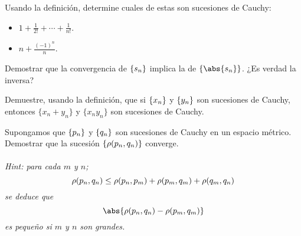 \begin{ejercicio}
	Usando la definición, determine cuales de estas son sucesiones de Cauchy:
	\begin{itemize}
		\item $1 + \frac{1}{2!} + \cdots + \frac{1}{n!}$.
		\item $n + \frac{(-1)^n}{n}$.
	\end{itemize}
\end{ejercicio}






\begin{ejercicio}
	Demostrar que la convergencia de $\{ s_{n} \}$ implica la de $\{ \abs{s_n} \}$. ¿Es verdad la inversa?
\end{ejercicio}




\begin{ejercicio}
	Demuestre, usando la definición, que si $\{ x_{n} \}$ y $\{ y_{n} \}$ son sucesiones de Cauchy, entonces $\{ x_n + y_n \}$ y $\{ x_n y_n \}$ son sucesiones de Cauchy.
\end{ejercicio}


\begin{ejercicio}
	Supongamos que $\{ p_{n} \}$ y $\{ q_{n} \}$ son sucesiones de Cauchy en un espacio métrico. Demostrar que la sucesión $\{ \rho(p_n,q_n) \}$ converge. \\\\
	\noindent \textit{Hint: para cada $m$ y $n$;}
		$$ \rho(p_n,q_n) \leq \rho(p_n,p_m) + \rho(p_m,q_m) + \rho(q_m,q_n) $$
	\noindent \textit{se deduce que}
		$$ \abs{\metric{p_n}{q_n} - \metric{p_m}{q_m}} $$
	\noindent \textit{es pequeño si $m$ y $n$ son grandes.}
\end{ejercicio}



















